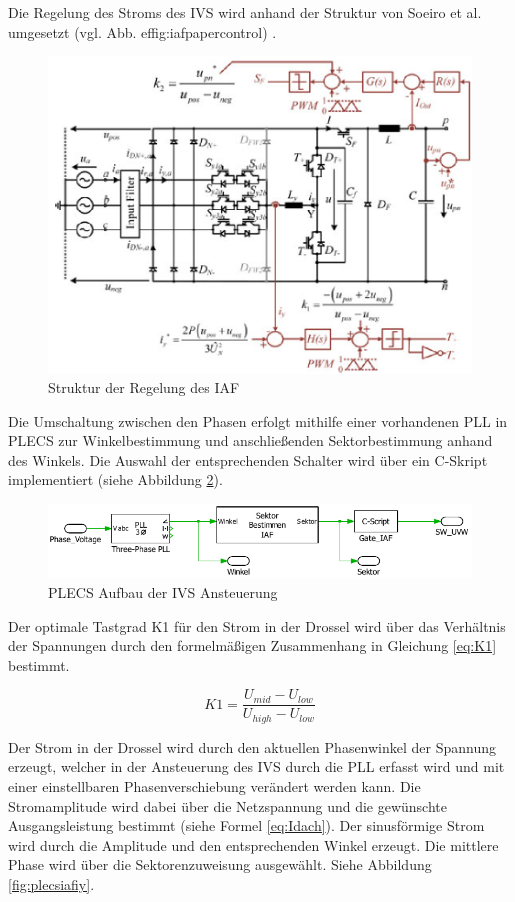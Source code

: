 		Die Regelung des Stroms des IVS wird anhand der Struktur von Soeiro et al. umgesetzt (vgl. Abb. ef{fig:iafpapercontrol}) \cite{Soeiro.2013}. 
		 \begin{figure}[H]
			\centering
			\includegraphics[width=0.7\linewidth]{content/Grafiken/IAF_Paper_Control}
			\caption{Struktur der Regelung des IAF \cite{Soeiro.2013}}
			\label{fig:iafpapercontrol}
		\end{figure}
		Die Umschaltung zwischen den Phasen erfolgt mithilfe einer vorhandenen PLL in PLECS zur Winkelbestimmung und anschließenden Sektorbestimmung anhand des Winkels. Die Auswahl der entsprechenden Schalter wird über ein C-Skript implementiert (siehe Abbildung \ref{fig:plecsiafivscontrol}). 
		\begin{figure}[H]
			\centering
			\includegraphics[width=1\linewidth]{content/Grafiken/PlecsIAFivscontrol}
			\caption{PLECS Aufbau der \gls{IVS} Ansteuerung}
			\label{fig:plecsiafivscontrol}
		\end{figure}
		Der optimale Tastgrad K1 für den Strom in der Drossel wird über das Verhältnis der Spannungen durch den formelmäßigen Zusammenhang in Gleichung \ref{eq:K1} bestimmt. 
		

		
		\begin{equation}
			\label{eq:K1}
			K1 = \dfrac{U_{mid}- U_{low}}{U_{high} -U_{low}} 
		\end{equation}
		
			Der Strom in der Drossel wird durch den aktuellen Phasenwinkel der Spannung erzeugt, welcher in der Ansteuerung des IVS durch die PLL erfasst wird und mit einer einstellbaren Phasenverschiebung verändert werden kann. Die Stromamplitude wird dabei über die Netzspannung und die gewünschte Ausgangsleistung bestimmt (siehe Formel \ref{eq:Idach}). Der sinusförmige Strom wird durch die Amplitude und den entsprechenden Winkel erzeugt. Die mittlere Phase wird über die Sektorenzuweisung ausgewählt. Siehe Abbildung \ref{fig:plecsiafiy}. 
		
